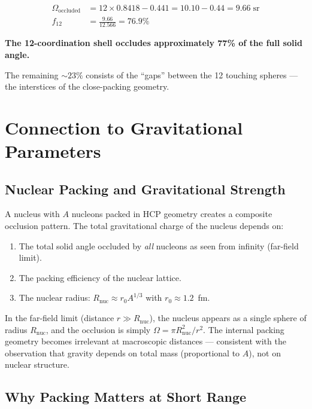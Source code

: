 \begin{align}
  \Omega_{\text{occluded}} &= 12 \times 0.8418 - 0.441 = 10.10 - 0.44 = 9.66\;\text{sr} \\
  f_{12} &= \frac{9.66}{12.566} = 76.9\%
\end{align}

\textbf{The 12-coordination shell occludes approximately 77\% of the full solid angle.}

The remaining $\sim 23\%$ consists of the ``gaps'' between the 12 touching spheres --- the interstices of the close-packing geometry.


\section{Connection to Gravitational Parameters}

\subsection{Nuclear Packing and Gravitational Strength}

A nucleus with $A$ nucleons packed in HCP geometry creates a composite occlusion pattern. The total gravitational charge of the nucleus depends on:
\begin{enumerate}
  \item The total solid angle occluded by \emph{all} nucleons as seen from infinity (far-field limit).
  \item The packing efficiency of the nuclear lattice.
  \item The nuclear radius: $R_{\text{nuc}} \approx r_0 A^{1/3}$ with $r_0 \approx 1.2$~fm.
\end{enumerate}

In the far-field limit (distance $r \gg R_{\text{nuc}}$), the nucleus appears as a single sphere of radius $R_{\text{nuc}}$, and the occlusion is simply $\Omega = \pi R_{\text{nuc}}^2/r^2$. The internal packing geometry becomes irrelevant at macroscopic distances --- consistent with the observation that gravity depends on total mass (proportional to $A$), not on nuclear structure.

\subsection{Why Packing Matters at Short Range}

